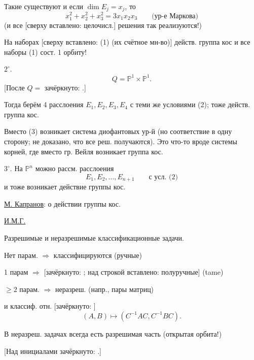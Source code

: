 Такие существуют и если $\dim E_j=x_j$, то
\begin{equation*}
x_1^2+x_2^2+x_3^2=3x_1x_2x_3
\qquad\text{(ур-е Маркова)} \tag{3}
\end{equation*}
(и все [сверху вставлено: целочисл.] решения так реализуются!)

На наборах [сверху вставлено: (1) (их счётное мн-во)]
действ. группа кос и все наборы (1)
сост. 1 орбиту!

$2^{\circ}$.
\begin{equation*}
Q=\mathbb{P}^{1}\times\mathbb{P}^{1}.
\end{equation*}
[После $Q=$ зачёркнуто: .]

Тогда берём 4 расслоения $E_1,E_2,E_3,E_4$
с теми же условиями (2); тоже действ. группа кос.

Вместо (3) возникает система диофантовых ур-й
(но соответствие в одну сторону; не доказано, что все реш. получаются).
Это что-то вроде системы корней, где вместо
гр. Вейля возникает группа кос.

$3^{\circ}$. На $\mathbb{P}^{n}$ можно рассм. расслоения
\begin{equation*}
E_1,E_2,\ldots,E_{n+1}\qquad\text{с усл. (2)}
\end{equation*}
и тоже возникает действие группы кос.

\underline{М. Капранов}: о действии группы кос.

\underline{И.М.Г.}

Разрешимые и неразрешимые классификационные задачи.

Нет парам. $\Rightarrow$ классифицируются (ручные)

1 парам $\Rightarrow$
[зачёркнуто: ; над строкой вставлено: полуручные] (tame)

$\geq 2$ парам. $\Rightarrow$ неразреш.
(напр., пары матриц)

и классиф. отн.
[зачёркнуто: ]
\begin{equation*}
(A,B)\mapsto(C^{-1}AC,C^{-1}BC).
\end{equation*}



В неразреш. задачах всегда есть разрешимая часть
(открытая орбита!)

[Над инициалами зачёркнуто: .]

